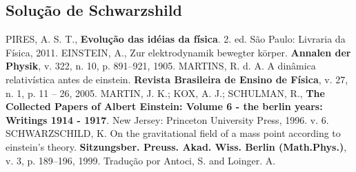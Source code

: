 \documentclass[12pt,a4paper,titlepage,brazil]{article}
\begin{document}

\subsection{Solução de Schwarzshild}


\begin{thebibliography}{99}
  PIRES, A. S. T., {\bf Evolução das idéias da física}. 2. ed. São Paulo: Livraria da Física, 2011. 
  EINSTEIN, A., Zur elektrodynamik bewegter körper. {\bf Annalen der Physik}, v. 322, n. 10, p. 891–921, 1905. 
  MARTINS, R. d. A. A dinâmica relativística antes de einstein. {\bf Revista Brasileira de Ensino de Física}, v. 27, n. 1, p. 11 – 26, 2005.
  MARTIN, J. K.; KOX, A. J.; SCHULMAN, R., {\bf The Collected Papers of Albert Einstein: Volume 6 - the berlin years: Writings 1914 - 1917}. New Jersey: Princeton University Press, 1996. v. 6.
  SCHWARZSCHILD, K. On the gravitational field of a mass point according to einstein’s theory. {\bf Sitzungsber. Preuss. Akad. Wiss. Berlin (Math.Phys.)}, v. 3, p. 189–196, 1999. Tradução por Antoci, S. and Loinger. A.

\end{thebibliography}
\end{document}
